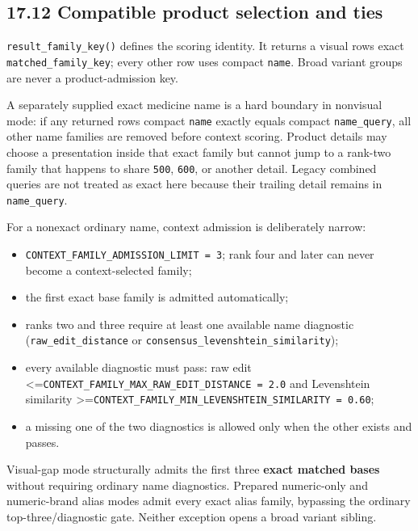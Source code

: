 \subsection{17.12 Compatible product selection and ties}\label{1712-compatible-product-selection-and-ties}

\texttt{result\_\allowbreak{}family\_\allowbreak{}key()} defines the scoring identity. It returns a visual row\textquotesingle s exact \texttt{matched\_\allowbreak{}family\_\allowbreak{}key}; every other row uses compact \texttt{name}. Broad variant groups are never a product-admission key.

A separately supplied exact medicine name is a hard boundary in nonvisual mode: if any returned row\textquotesingle s compact \texttt{name} exactly equals compact \texttt{name\_\allowbreak{}query}, all other name families are removed before context scoring. Product details may choose a presentation inside that exact family but cannot jump to a rank-two family that happens to share \texttt{500}, \texttt{600}, or another detail. Legacy combined queries are not treated as exact here because their trailing detail remains in \texttt{name\_\allowbreak{}query}.

For a nonexact ordinary name, context admission is deliberately narrow:

\begin{itemize}
\tightlist
\item
  \texttt{CONTEXT\_\allowbreak{}FAMILY\_\allowbreak{}ADMISSION\_\allowbreak{}LIMIT\ =\ 3}; rank four and later can never become a context-selected family;
\item
  the first exact base family is admitted automatically;
\item
  ranks two and three require at least one available name diagnostic (\texttt{raw\_\allowbreak{}edit\_\allowbreak{}distance} or \texttt{consensus\_\allowbreak{}levenshtein\_\allowbreak{}similarity});
\item
  every available diagnostic must pass: raw edit \textless=\texttt{CONTEXT\_\allowbreak{}FAMILY\_\allowbreak{}MAX\_\allowbreak{}RAW\_\allowbreak{}EDIT\_\allowbreak{}DISTANCE\ =\ 2.0} and Levenshtein similarity \textgreater=\texttt{CONTEXT\_\allowbreak{}FAMILY\_\allowbreak{}MIN\_\allowbreak{}LEVENSHTEIN\_\allowbreak{}SIMILARITY\ =\ 0.60};
\item
  a missing one of the two diagnostics is allowed only when the other exists and passes.
\end{itemize}

Visual-gap mode structurally admits the first three \textbf{exact matched bases} without requiring ordinary name diagnostics. Prepared numeric-only and numeric-brand alias modes admit every exact alias family, bypassing the ordinary top-three/diagnostic gate. Neither exception opens a broad variant sibling.

